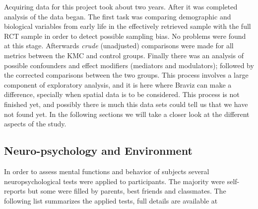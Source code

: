 Acquiring data for this project took about two years. After it was completed analysis of the data began. The first task was comparing demographic and biological variables from early life in the effectively retrieved sample with the full RCT sample in order to detect possible sampling bias. No problems were found at this stage. Afterwards \emph{crude} (unadjusted) comparisons were made for all metrics between the KMC and control groups. Finally there was an analysis of possible confounders and effect modifiers (mediators and modulators); followed by the corrected comparisons between the two groups. This process involves a large component of exploratory analysis, and it is here where Braviz can make a difference, specially when spatial data is to be considered. This process is not finished yet, and possibly there is much this data sets could tell us that we have not found yet. In the following sections we will take a closer look at the different aspects of the study.

\subsection{Neuro-psychology and Environment}

In order to assess mental functions and behavior of subjects several neuropsychological tests were applied to participants. The majority were self-reports but some were filled by parents, best friends and classmates. The following list summarizes the applied tests, full details are available at \autocite{FINAL REPORT}

